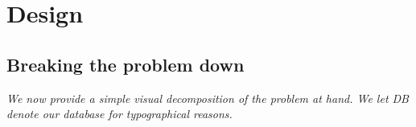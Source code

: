 \pagestyle{fancy}
\chead{\mdseries \thepage}

\usetikzlibrary{positioning}
\usetikzlibrary{calc}

\chapter{Design}

\section{Breaking the problem down}
\label{sec:breakdown}

\textit
{
We now provide a simple visual decomposition of the problem at 
hand. We let DB denote our database for typographical reasons.
}

